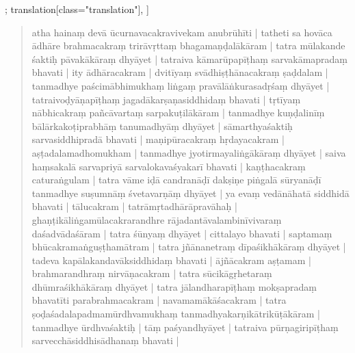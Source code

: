 \begin{alignment}[
  texts=edition[class="edition"];
  translation[class="translation"],
  ]
\begin{translation}
\begin{tlate}
{\begin{quote}
          atha hainaṃ devā ūcurnavacakravivekam anubrūhīti | tatheti sa hovāca ādhāre brahmacakraṃ trirāvṛttaṃ bhagamaṇḍalākāram | tatra mūlakande śaktiḥ pāvakākāraṃ dhyāyet | tatraiva kāmarūpapīṭhaṃ sarvakāmapradaṃ bhavati | ity ādhāracakram | dvitīyaṃ svādhiṣṭhānacakraṃ ṣaḍdalam | tanmadhye paścimābhimukhaṃ liṅgaṃ pravālāṅkurasadṛśaṃ dhyāyet | tatraivoḍyāṇapīṭhaṃ jagadākarṣaṇasiddhidaṃ bhavati | tṛtīyaṃ nābhicakraṃ pañcāvartaṃ sarpakuṭilākāram | tanmadhye kuṇḍalinīṃ bālārkakoṭiprabhāṃ tanumadhyāṃ dhyāyet | sāmarthyaśaktiḥ sarvasiddhipradā bhavati | maṇipūracakraṃ hṛdayacakram | aṣṭadalamadhomukham | tanmadhye jyotirmayaliṅgākāraṃ dhyāyet | saiva haṃsakalā sarvapriyā sarvalokavaśyakarī bhavati | kaṇṭhacakraṃ caturaṅgulam | tatra vāme iḍā candranāḍī dakṣiṇe piṅgalā sūryanāḍī tanmadhye suṣumnāṃ śvetavarṇāṃ dhyāyet | ya evaṃ vedānāhatā siddhidā bhavati | tālucakram | tatrāmṛtadhārāpravāhaḥ | ghaṇṭikāliṅgamūlacakrarandhre rājadantāvalambinīvivaraṃ daśadvādaśāram | tatra śūnyaṃ dhyāyet | cittalayo bhavati | saptamaṃ bhūcakramaṅguṣṭhamātram | tatra jñānanetraṃ dīpaśikhākāraṃ dhyāyet | tadeva kapālakandavāksiddhidaṃ bhavati | ājñācakram aṣṭamam | brahmarandhraṃ nirvāṇacakram | tatra sūcikāgṛhetaraṃ dhūmraśikhākāraṃ dhyāyet | tatra jālandharapīṭhaṃ mokṣapradaṃ bhavatīti parabrahmacakram | navamamākāśacakram | tatra ṣoḍaśadalapadmamūrdhvamukhaṃ tanmadhyakarṇikātrikūṭākāram | tanmadhye ūrdhvaśaktiḥ | tāṃ paśyandhyāyet | tatraiva pūrṇagiripīṭhaṃ sarvecchāsiddhisādhanaṃ bhavati |
        \end{quote}}
    \end{tlate}
  \end{translation}
  \ekdpb*{}
\end{alignment}
